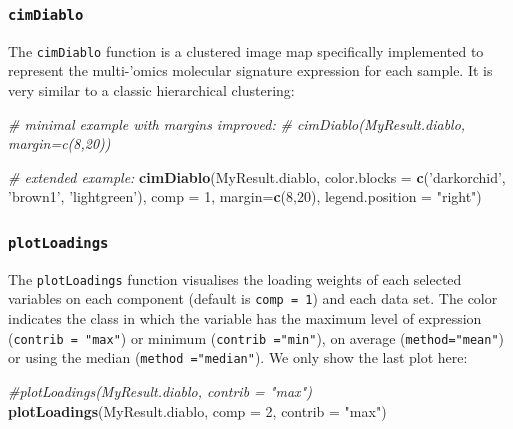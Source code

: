 \documentclass[]{book}
\newenvironment{Shaded}{\begin{snugshade}}{\end{snugshade}}
\newcommand{\KeywordTok}[1]{\textcolor[rgb]{0.13,0.29,0.53}{\textbf{#1}}}
\newcommand{\DataTypeTok}[1]{\textcolor[rgb]{0.13,0.29,0.53}{#1}}
\newcommand{\DecValTok}[1]{\textcolor[rgb]{0.00,0.00,0.81}{#1}}
\newcommand{\StringTok}[1]{\textcolor[rgb]{0.31,0.60,0.02}{#1}}
\newcommand{\CommentTok}[1]{\textcolor[rgb]{0.56,0.35,0.01}{\textit{#1}}}
\newcommand{\NormalTok}[1]{#1}
\theoremstyle{definition}
\theoremstyle{definition}
\theoremstyle{definition}
\theoremstyle{remark}
\begin{document}
\subsubsection{\texorpdfstring{\texttt{cimDiablo}}{cimDiablo}}\label{cimdiablo}

The \texttt{cimDiablo} function is a clustered image map specifically
implemented to represent the multi-'omics molecular signature expression
for each sample. It is very similar to a classic hierarchical
clustering:

\begin{Shaded}
\begin{Highlighting}[]
\CommentTok{# minimal example with margins improved:}
\CommentTok{# cimDiablo(MyResult.diablo, margin=c(8,20))}

\CommentTok{# extended example:}
\KeywordTok{cimDiablo}\NormalTok{(MyResult.diablo, }\DataTypeTok{color.blocks =} \KeywordTok{c}\NormalTok{(}\StringTok{'darkorchid'}\NormalTok{, }\StringTok{'brown1'}\NormalTok{, }\StringTok{'lightgreen'}\NormalTok{), }\DataTypeTok{comp =} \DecValTok{1}\NormalTok{, }\DataTypeTok{margin=}\KeywordTok{c}\NormalTok{(}\DecValTok{8}\NormalTok{,}\DecValTok{20}\NormalTok{), }\DataTypeTok{legend.position =} \StringTok{"right"}\NormalTok{)}
\end{Highlighting}
\end{Shaded}

\subsubsection{\texorpdfstring{\texttt{plotLoadings}}{plotLoadings}}\label{plotloadings}

The \texttt{plotLoadings} function visualises the loading weights of
each selected variables on each component (default is
\texttt{comp\ =\ 1}) and each data set. The color indicates the class in
which the variable has the maximum level of expression
(\texttt{contrib\ =\ "max"}) or minimum (\texttt{contrib\ ="min"}), on
average (\texttt{method="mean"}) or using the median
(\texttt{method\ ="median"}). We only show the last plot here:

\begin{Shaded}
\begin{Highlighting}[]
\CommentTok{#plotLoadings(MyResult.diablo, contrib = "max")}
\KeywordTok{plotLoadings}\NormalTok{(MyResult.diablo, }\DataTypeTok{comp =} \DecValTok{2}\NormalTok{, }\DataTypeTok{contrib =} \StringTok{"max"}\NormalTok{)}
\end{Highlighting}
\end{Shaded}
\end{document}
